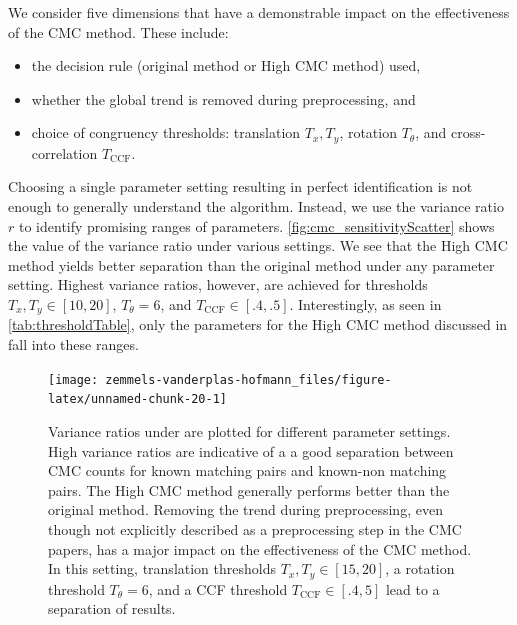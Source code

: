 We consider five dimensions that have a demonstrable impact on the
effectiveness of the CMC method. These include:

\begin{itemize}
\item the decision rule (original method or High CMC method) used,

\item whether the global trend is removed during preprocessing, and

\item choice of congruency thresholds: translation $T_x, T_y$, rotation $T_\theta$, and cross-correlation $T_{\text{CCF}}$.
\end{itemize}

Choosing a single parameter setting resulting in perfect identification
is not enough to generally understand the algorithm. Instead, we use the
variance ratio \(r\) to identify promising ranges of parameters.
\autoref{fig:cmc_sensitivityScatter} shows the value of the variance
ratio under various settings. We see that the High CMC method yields
better separation than the original method under any parameter setting.
Highest variance ratios, however, are achieved for thresholds
\(T_x, T_y \in [10,20]\), \(T_\theta = 6\), and
\(T_{\text{CCF}} \in [.4,.5]\). Interestingly, as seen in
\autoref{tab:thresholdTable}, only the parameters for the High CMC
method discussed in \citet{song_estimating_2018} fall into these ranges.

\begin{Schunk}
\begin{figure}[htbp]

\texttt{[image: zemmels-vanderplas-hofmann\_files/figure-latex/unnamed-chunk-20-1]} \hfill{}

\caption{\label{fig:cmc_sensitivityScatter} Variance ratios under are plotted for different parameter settings. High variance ratios are indicative of a a good separation between CMC counts for known matching pairs and known-non matching pairs. The High CMC method generally performs better than the original method. Removing the trend during preprocessing, even though not explicitly described as a preprocessing step in the CMC papers, has a major impact on the effectiveness of the CMC method. In this setting, translation thresholds $T_x, T_y \in [15,20]$, a rotation threshold $T_\theta = 6$, and a CCF threshold $T_{\text{CCF}} \in [.4,5]$ lead to a separation of results. }\label{fig:unnamed-chunk-20}
\end{figure}
\end{Schunk}

